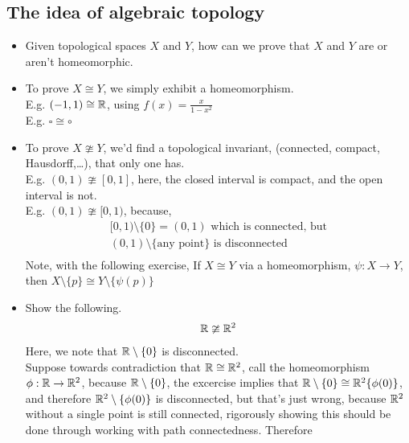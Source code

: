 \subsection{The idea of algebraic topology}
    \begin{itemize}
        \item Given topological spaces $X$ and $Y$, how can we prove that $X$ and $Y$ are or aren't homeomorphic.
        \item To prove $X\cong Y$, we simply exhibit a homeomorphism.\\
            E.g. $(-1,1) \cong \mathbb{R}$, using $f(x) = \frac{x}{1-x^2}$\\
            E.g. $\square \cong \circ$
        \item To prove $X\ncong Y$, we'd find a topological invariant, (connected, compact, Hausdorff,\ldots), that only one has.\\
            E.g. $(0,1) \ncong [0,1]$, here, the closed interval is compact, and the open interval is not.\\
            E.g. $(0,1) \ncong [0,1)$, because,\\
            \begin{align*}
                [0,1)\setminus \{0\} = (0,1) \text{ which is connected, but}\\
                (0,1)\setminus \{\text{any point}\} \text{ is disconnected}\\
            \end{align*}
            Note, with the following exercise, If $X\cong Y$ via a homeomorphism, $\psi : X\rightarrow Y$,
            then $X\setminus\{p\}\cong Y\setminus \{\psi(p)\}$
        \item Show the following. \\
            \begin{align*}
                \mathbb{R} \ncong \mathbb{R}^2\\
            \end{align*}
            Here, we note that $\mathbb{R} \setminus \{0\}$ is disconnected.\\
            Suppose towards contradiction that $\mathbb{R} \cong\mathbb{R}^2$, call the homeomorphism $\phi:\mathbb{R}\rightarrow \mathbb{R}^2$, because
            $\mathbb{R}\setminus \{0\}$, the excercise implies that $\mathbb{R}\setminus \{0\}\cong \mathbb{R}^2\{\phi(0)\}$, and therefore
            $\mathbb{R}^2\setminus\{\phi(0)\}$ is disconnected, but that's just wrong, because $\mathbb{R}^2$ without a single point
            is still connected, rigorously showing this should be done through working with path connectedness. Therefore

\end{itemize}
